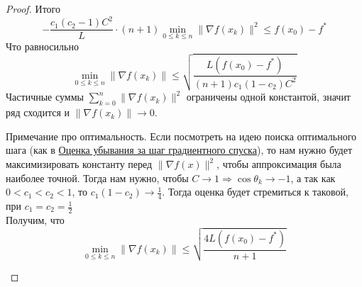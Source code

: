 \begin{proof}
  Итого
  \[- \frac{c_1(c_2-1)C^2}{L} \cdot (n+1) \min_{0\le k\le n} \|\nabla f(x_k)\|^2 \le f(x_0) -f^{*}
  \]
  Что равносильно
  \[
  \min_{0\le k\le n} \| \nabla f(x_k)\| \le \sqrt{\frac{L (f(x_0) - f^{*})}{(n+1)c_1(1-c_2)C^{2}}}
  \]
  Частичные суммы $\sum_{k=0}^n \|\nabla f(x_k)\|^2$ ограничены одной константой, значит ряд сходится и $\|\nabla f(x_k)\| \rightarrow 0$.

  \begin{remark}
    Примечание про оптимальность. Если посмотреть на идею поиска оптимального шага (как в \hyperref[note:FFEA1F1D-B70C-4B4A-9386-8344A2A3BBC4]{Оценка убывания за шаг градиентного спуска}), то нам нужно будет максимизировать константу перед $\|\nabla f(x)\|^2$, чтобы аппроксимация была наиболее точной.
    Тогда нам нужно, чтобы $C \rightarrow 1 \Rightarrow \cos \theta_k \rightarrow -1$, а так как $0 < c_1 < c_2 < 1$, то $c_1(1-c_2) \rightarrow \frac{1}{4}$.
    Тогда оценка будет стремиться к таковой, при $c_1 = c_2 = \frac{1}{2}$ \\
    Получим, что
    \[
    \min_{0\le k \le n} \|\nabla f(x_k)\| \le \sqrt{\frac{4L (f(x_0) - f^{*})}{n+1}}
    \]
  \end{remark}
\end{proof}
